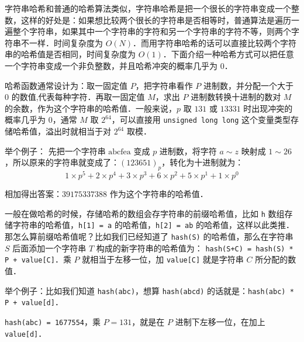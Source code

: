 
字符串哈希和普通的哈希算法类似，字符串哈希是把一个很长的字符串变成一个整数，这样的好处是：如果想比较两个很长的字符串是否相等时，普通算法是遍历一遍整个字符串，如果其中一个字符串的字符和另一个字符串的字符不等，则两个字符串不一样．时间复杂度为 $O(N)$．而用字符串哈希的话可以直接比较两个字符串的哈希值是否相同，时间复杂度为 $O(1)$．下面介绍一种哈希方式可以把任意一个字符串变成一个非负整数，并且哈希冲突的概率几乎为 $0$．

哈希函数通常设计为：取一固定值 $P$，把字符串看作 $P$ 进制数，并分配一个大于 $0$ 的数值,代表每种字符．再取一固定值 $M$，求出 $P$ 进制数转换十进制的数对 $M$ 的余数，作为这个字符串的哈希值．一般来说，$p$ 取 $131$ 或 $13331$ 时出现冲突的概率几乎为 $0$，通常 $M$ 取 $2^{64}$，可以直接用 \verb|unsigned long long| 这个变量类型存储哈希值，溢出时就相当于对 $2^{64}$ 取模．

举个例子：
先把一个字符串 $\text{abcfea}$ 变成 $p$ 进制数，将字符 $a \sim z$ 映射成 $1 \sim 26$，所以原来的字符串就变成了：$(123651)_p$，转化为十进制就为：\begin{equation}
1 \times p^5 + 2 \times p^4 + 3 \times p^3 + 6 \times p^2 + 5 \times p^1 + 1 \times p^0
\end{equation}

相加得出答案：$39175337388$ 作为这个字符串的哈希值．

一般在做哈希的时候，存储哈希的数组会存字符串的前缀哈希值，比如 \verb|h| 数组存储字符串的哈希值，\verb|h[1] = a| 的哈希值，\verb|h[2] = ab| 的哈希值，这样以此类推．那怎么算前缀哈希值呢？比如我们已经知道了 \verb|hash(S)| 的哈希值，那么在字符串 $S$ 后面添加一个字符串 $T$ 构成的新字符串的哈希值为： \verb|hash(S+C) = hash(S) * P + value[C]|．乘 $P$ 就相当于左移一位，加 \verb|value[C]| 就是字符串 $C$ 所分配的数值．

举个例子：比如我们知道 \verb|hash(abc)|，想算 \verb|hash(abcd)| 的话就是：\verb|hash(abc) * P + value[d]|．

\verb|hash(abc) = 1677554|，乘 $P = 131$，就是在 $P$ 进制下左移一位，在加上 \verb|value[d]|．